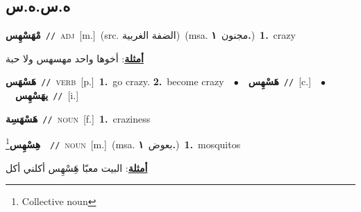 \documentclass[10pt,a4paper,twoside]{article} %
\begin{document}
\begin{multicols}{2}
\vspace{-3mm}
\subsection*{\color{blue}\foreignlanguage{arabic}{ه.س.ه.س}\color{blue}{}} 

{\setlength\topsep{0pt}\textbf{\foreignlanguage{arabic}{مْهَسْهِس}}\ {\color{gray}\texttt{//}\color{black}}\ \textsc{adj}\ [m.]\ (src. \color{gray}\foreignlanguage{arabic}{الضفة الغربية}\color{black})\ \color{gray}(msa. \foreignlanguage{arabic}{مجنون}~\foreignlanguage{arabic}{\textbf{١.}})\color{black}\ \textbf{1.}~crazy\  \begin{flushright}\color{gray}\foreignlanguage{arabic}{\textbf{\underline{\foreignlanguage{arabic}{أمثلة}}}: أخوها واحد مهسهس ولا حبة}\end{flushright}\color{black}} \vspace{2mm}

{\setlength\topsep{0pt}\textbf{\foreignlanguage{arabic}{هَسْهَس}}\ {\color{gray}\texttt{//}\color{black}}\ \textsc{verb}\ [p.]\ \textbf{1.}~go crazy.  \textbf{2.}~become crazy\ \ $\bullet$\ \ \setlength\topsep{0pt}\textbf{\foreignlanguage{arabic}{هَسْهِس}}\ {\color{gray}\texttt{//}\color{black}}\ [c.]\ \ $\bullet$\ \ \setlength\topsep{0pt}\textbf{\foreignlanguage{arabic}{يهَسْهِس}}\ {\color{gray}\texttt{//}\color{black}}\ [i.]\ } \vspace{2mm}

{\setlength\topsep{0pt}\textbf{\foreignlanguage{arabic}{هَسْهَسِة}}\ {\color{gray}\texttt{//}\color{black}}\ \textsc{noun}\ [f.]\ \textbf{1.}~craziness\ } \vspace{2mm}

{\setlength\topsep{0pt}\textbf{\foreignlanguage{arabic}{هِسْهِس}}\footnote{Collective noun}\ \ {\color{gray}\texttt{//}\color{black}}\ \textsc{noun}\ [m.]\ \color{gray}(msa. \foreignlanguage{arabic}{بعوض}~\foreignlanguage{arabic}{\textbf{١.}})\color{black}\ \textbf{1.}~mosquitos\  \begin{flushright}\color{gray}\foreignlanguage{arabic}{\textbf{\underline{\foreignlanguage{arabic}{أمثلة}}}: البيت معبّا هَِسْهِس أكلني أكل}\end{flushright}\color{black}} \vspace{2mm}


\end{multicols}
\end{document}
